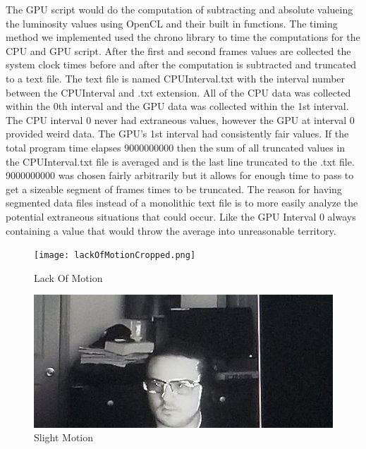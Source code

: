 \documentclass[conference]{IEEEtran}
\begin{document}
The GPU script would do the computation of subtracting and absolute valueing the luminosity values using OpenCL and their built in functions. The timing method we implemented used the chrono library to time the computations for the CPU and GPU script. After the first and second frames values are collected the system clock times before and after the computation is subtracted and truncated to a text file. The text file is named CPUInterval.txt with the interval number between the CPUInterval and .txt extension. All of the CPU data was collected within the 0th interval and the GPU data was collected within the 1st interval.\\
The CPU interval 0 never had extraneous values, however the GPU at interval 0 provided weird data. The GPU's 1st interval had consistently fair values. If the total program time elapses 9000000000 then the sum of all truncated values in the CPUInterval.txt file is averaged and is the last line truncated to the .txt file. 9000000000 was chosen fairly arbitrarily but it allows for enough time to pass to get a sizeable segment of frames times to be truncated. The reason for having segmented data files instead of a monolithic text file is to more easily analyze the potential extraneous situations that could occur. Like the GPU Interval 0 always containing a value that would throw the average into unreasonable territory.

\begin{figure}[h!]
    \texttt{[image: lackOfMotionCropped.png]}
    \caption{Lack Of Motion}
    \label{fig:Performance of Original Pencil Drawing Program}
\end{figure}

\begin{figure}[h!]
    \includegraphics[width=\linewidth]{slightMotionCropped.jpg}
    \caption{Slight Motion}
    \label{fig:Performance of Original Pencil Drawing Program}
\end{figure}
\end{document}
